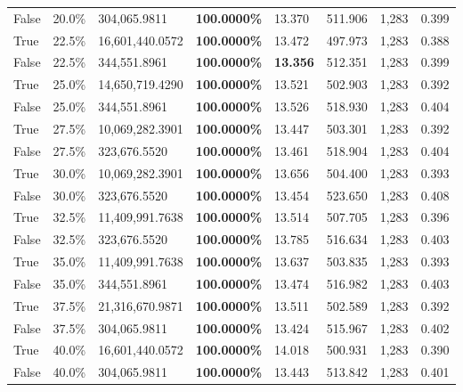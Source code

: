 \begin{table}[H]
\begin{tabular}{lllrllll}
\cline{1-8}
False & 20.0\% & 304,065.9811 & \bfseries \color{red} 100.0000\% & 13.370 & 511.906 & 1,283 & 0.399 \\
\cline{1-8}
True & 22.5\% & 16,601,440.0572 & \bfseries \color{red} 100.0000\% & 13.472 & 497.973 & 1,283 & 0.388 \\
\cline{1-8}
False & 22.5\% & 344,551.8961 & \bfseries \color{red} 100.0000\% & \bfseries \color{red} 13.356 & 512.351 & 1,283 & 0.399 \\
\cline{1-8}
True & 25.0\% & 14,650,719.4290 & \bfseries \color{red} 100.0000\% & 13.521 & 502.903 & 1,283 & 0.392 \\
\cline{1-8}
False & 25.0\% & 344,551.8961 & \bfseries \color{red} 100.0000\% & 13.526 & 518.930 & 1,283 & 0.404 \\
\cline{1-8}
True & 27.5\% & 10,069,282.3901 & \bfseries \color{red} 100.0000\% & 13.447 & 503.301 & 1,283 & 0.392 \\
\cline{1-8}
False & 27.5\% & 323,676.5520 & \bfseries \color{red} 100.0000\% & 13.461 & 518.904 & 1,283 & 0.404 \\
\cline{1-8}
True & 30.0\% & 10,069,282.3901 & \bfseries \color{red} 100.0000\% & 13.656 & 504.400 & 1,283 & 0.393 \\
\cline{1-8}
False & 30.0\% & 323,676.5520 & \bfseries \color{red} 100.0000\% & 13.454 & 523.650 & 1,283 & 0.408 \\
\cline{1-8}
True & 32.5\% & 11,409,991.7638 & \bfseries \color{red} 100.0000\% & 13.514 & 507.705 & 1,283 & 0.396 \\
\cline{1-8}
False & 32.5\% & 323,676.5520 & \bfseries \color{red} 100.0000\% & 13.785 & 516.634 & 1,283 & 0.403 \\
\cline{1-8}
True & 35.0\% & 11,409,991.7638 & \bfseries \color{red} 100.0000\% & 13.637 & 503.835 & 1,283 & 0.393 \\
\cline{1-8}
False & 35.0\% & 344,551.8961 & \bfseries \color{red} 100.0000\% & 13.474 & 516.982 & 1,283 & 0.403 \\
\cline{1-8}
True & 37.5\% & 21,316,670.9871 & \bfseries \color{red} 100.0000\% & 13.511 & 502.589 & 1,283 & 0.392 \\
\cline{1-8}
False & 37.5\% & 304,065.9811 & \bfseries \color{red} 100.0000\% & 13.424 & 515.967 & 1,283 & 0.402 \\
\cline{1-8}
True & 40.0\% & 16,601,440.0572 & \bfseries \color{red} 100.0000\% & 14.018 & 500.931 & 1,283 & 0.390 \\
\cline{1-8}
False & 40.0\% & 304,065.9811 & \bfseries \color{red} 100.0000\% & 13.443 & 513.842 & 1,283 & 0.401 \\

\end{tabular}
\end{table}
